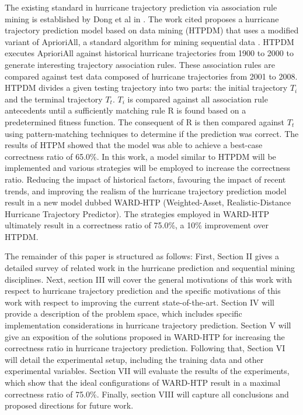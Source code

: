 \documentclass[12pt,conference]{IEEEtran}
\begin{document}
The existing standard in hurricane trajectory prediction via association rule mining is established by Dong et al in \cite{major-hurricane-model}. The work cited proposes a hurricane trajectory prediction model based on data mining (HTPDM) that uses a modified variant of AprioriAll, a standard algorithm for mining sequential data \cite{AprioriAll-original}. HTPDM executes AprioriAll against historical hurricane trajectories from 1900 to 2000 to generate interesting trajectory association rules. These association rules are compared against test data composed of hurricane trajectories from 2001 to 2008. HTPDM divides a given testing trajectory into two parts: the initial trajectory $T_{i}$ and the terminal trajectory $T_{t}$. $T_{i}$ is compared against all association rule antecedents until a sufficiently matching rule R is found based on a predetermined fitness function. The consequent of R is then compared against $T_{t}$ using pattern-matching techniques to determine if the prediction was correct. The results of HTPM showed that the model was able to achieve a best-case correctness ratio of 65.0\%. In this work, a model similar to HTPDM will be implemented and various strategies will be employed to increase the correctness ratio. Reducing the impact of historical factors, favouring the impact of recent trends, and improving the realism of the hurricane trajectory prediction model result in a new model dubbed WARD-HTP (Weighted-Asset, Realistic-Distance Hurricane Trajectory Predictor). The strategies employed in WARD-HTP ultimately result in a correctness ratio of 75.0\%, a 10\% improvement over HTPDM.

The remainder of this paper is structured as follows: First, Section II gives a detailed survey of related work in the hurricane prediction and sequential mining disciplines. Next, section III will cover the general motivations of this work with respect to hurricane trajectory prediction and the specific motivations of this work with respect to improving the current state-of-the-art. Section IV will provide a description of the problem space, which includes specific implementation considerations in hurricane trajectory prediction. Section V will give an exposition of the solutions proposed in WARD-HTP for increasing the correctness ratio in hurricane trajectory prediction. Following that, Section VI will detail the experimental setup, including the training data and other experimental variables. Section VII will evaluate the results of the experiments, which show that the ideal configurations of WARD-HTP result in a maximal correctness ratio of 75.0\%. Finally, section VIII will capture all conclusions and proposed directions for future work.
\end{document}
